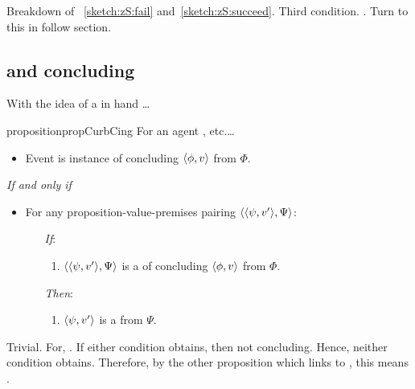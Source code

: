 \begin{note}
  Breakdown of ~\ref{sketch:zS:fail} and~\ref{sketch:zS:succeed}.
  Third condition.
  .
  Turn to this in follow section.
\end{note}

\subsection{ and concluding}
\label{cha:zS:sec:question}

\begin{note}
  With the idea of a \curb{} in hand \dots

  \begin{restatable}{proposition}{propCurbCing}
    \label{prop:sCing}
    For an agent \vAgent{}, etc.\dots

    \begin{itemize}
    \item
      Event is instance of concluding \(\langle \phi, v \rangle\) from \(\Phi\).
    \end{itemize}

    \emph{If and only if}

    \begin{itemize}
    \item
      For any proposition-value-premises pairing \(\langle \langle \psi, v' \rangle, \Psi \rangle\):
      \begin{itemize}
      \item[\emph{If}:]
        \begin{enumerate}[label=\alph*., ref=(\alph*)]
        \item
          \label{question:zs:option}
          \(\langle \langle \psi, v' \rangle, \Psi \rangle\) is a \curb{} of concluding \(\langle \phi, v \rangle\) from \(\Phi\).
        \end{enumerate}
      \item[\emph{Then}:]
        \begin{enumerate}[label=\alph*., ref=(\alph*), resume]
        \item
          \label{question:zs:may-fail}
          \(\langle \psi, v' \rangle\) is a \fc{} from \(\Psi\).
        \end{enumerate}
      \end{itemize}
    \end{itemize}
    \begin{argument}
      Trivial.
      For, \curb{}.
      If either condition obtains, then not concluding.
      Hence, neither condition obtains.
      Therefore, by the other proposition which links to \fc{}, this means \fc{}.
    \end{argument}
  \end{restatable}
\end{note}

